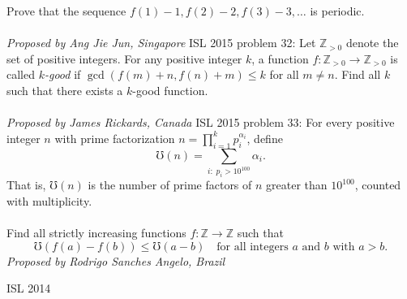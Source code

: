 Prove that the sequence $f(1) - 1, f(2) - 2, f(3) - 3, \ldots$ is periodic. \\\\
\textit{Proposed by Ang Jie Jun, Singapore} 
ISL 2015 problem 32:  Let $\mathbb{Z}_{>0}$ denote the set of positive integers. For any positive integer $k$, a function $f: \mathbb{Z}_{>0} \to \mathbb{Z}_{>0}$ is called \textit{$k$-good} if $\gcd(f(m) + n, f(n) + m) \le k$ for all $m \neq n$. Find all $k$ such that there exists a $k$-good function. \\\\
\textit{Proposed by James Rickards, Canada} 
ISL 2015 problem 33:  For every positive integer $n$ with prime factorization $n = \prod_{i = 1}^k p_i^{\alpha_i}$, define
\[ \mho(n) = \sum_{i: \; p_i > 10^{100}} \alpha_i. \]
That is, $\mho(n)$ is the number of prime factors of $n$ greater than $10^{100}$, counted with multiplicity. \\\\
Find all strictly increasing functions $f: \mathbb{Z} \to \mathbb{Z}$ such that
\[
\mho(f(a) - f(b)) \le \mho(a - b) \quad \text{for all integers } a \text{ and } b \text{ with } a > b.
\]
\textit{Proposed by Rodrigo Sanches Angelo, Brazil} 

ISL 2014 

